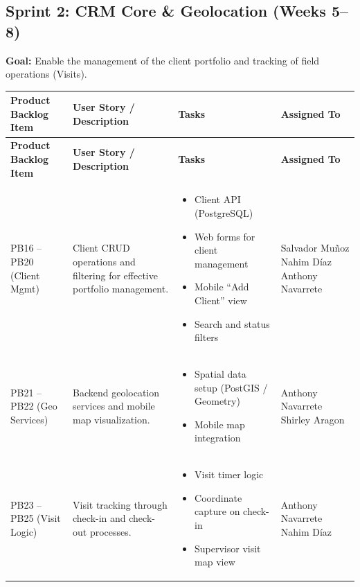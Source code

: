 \documentclass[letterpaper%
, oneside%
, 12pt%
, memoireprojet%
, english%
,creativecommons,hyperref, withAlgo2e %
]{thETS}
\begin{document}
\endgroup

\clearpage
\subsection{Sprint 2: CRM Core \& Geolocation (Weeks 5--8)}
\textbf{Goal:} Enable the management of the client portfolio and tracking of field operations (Visits).

\begingroup
\setlength{\LTleft}{-1.2cm plus -1fill}
\setlength{\LTright}{\LTleft}
\setlength{\LTcapwidth}{\textwidth}

\begin{longtable}{|
p{3.0cm}|
p{4.6cm}|
p{5.6cm}|
p{3.0cm}|
}
\hline
\textbf{Product Backlog Item} &
\textbf{User Story / Description} &
\textbf{Tasks} &
\textbf{Assigned To} \\ \hline
\endfirsthead

\hline
\textbf{Product Backlog Item} &
\textbf{User Story / Description} &
\textbf{Tasks} &
\textbf{Assigned To} \\ \hline
\endhead

PB16 -- PB20 (Client Mgmt) &
Client CRUD operations and filtering for effective portfolio management. &
\begin{itemize}\setlength{\itemsep}{2pt}
\item Client API (PostgreSQL)
\item Web forms for client management
\item Mobile ``Add Client'' view
\item Search and status filters
\end{itemize} &
Salvador Muñoz \newline
Nahim Díaz \newline
Anthony Navarrete \\ \hline

PB21 -- PB22 (Geo Services) &
Backend geolocation services and mobile map visualization. &
\begin{itemize}\setlength{\itemsep}{2pt}
\item Spatial data setup (PostGIS / Geometry)
\item Mobile map integration
\end{itemize} &
Anthony Navarrete \newline
Shirley Aragon \\ \hline

PB23 -- PB25 (Visit Logic) &
Visit tracking through check-in and check-out processes. &
\begin{itemize}\setlength{\itemsep}{2pt}
\item Visit timer logic
\item Coordinate capture on check-in
\item Supervisor visit map view
\end{itemize} &
Anthony Navarrete \newline
Nahim Díaz \\ \hline


\end{longtable}
\end{document}
